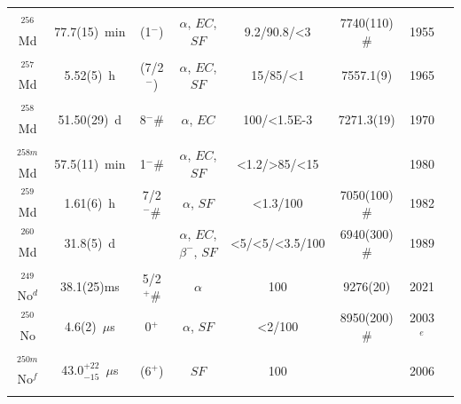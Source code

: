 \begin{center}
\begin{longtable}{c|ccccccl}
			& 				&			&					&			&				    &		&{\tiny\cite{Devaraja2019}}\\
$^{256}$Md	& 77.7(15)~min	&  (1$^-$)	&$\alpha$, $EC$, $SF$&9.2/90.8/<3& 7740(110)$\#$	&1955	&{\tiny\cite{Ghiorso1955,Phillips1958,Sikkeland1965,Fields1970,Hoff1971,Moody1993}}\\
			& 				&			&					&			&				    &		&{\tiny\cite{Ahmad2000,Devaraja2019}}\\
$^{257}$Md	& 5.52(5)~h		&  (7/2$^-$)	&$\alpha$, $EC$, $SF$	&15/85/<1& 7557.1(9)	&1965	&{\tiny\cite{Sikkeland1965,Fields1970,Hoff1971,Moody1993,Holden2000,Pal2021}}\\
			& 				&			&					&			&				    &		&{\tiny\cite{Devaraja2019}}\\
$^{258}$Md	& 51.50(29)~d	&  8$^- \#$	&$\alpha$, $EC$	    &100/<1.5E-3& 7271.3(19)		&1970	&{\tiny\cite{Hulet1968,Fields1970,Hoffman1980,Hulet1986,Moody1993,Ahmad2000}}\\
			& 				&			&					&			&				    &		&{\tiny\cite{Devaraja2019}}\\
$^{258m}$Md	& 57.5(11)~min	&  1$^- \#$	&$\alpha$, $EC$, $SF$&<1.2/>85/<15& 				&1980	&{\tiny\cite{Hulet1968,Fields1970,Hoffman1980,Hulet1986,Moody1993,Ahmad2000}}\\
$^{259}$Md	& 1.61(6)~h		& 7/2$^- \#$&$\alpha$, $SF$		&<1.3/100	& 7050(100)$\#$	    &1982	&{\tiny\cite{Wild1982,Hulet1989,Sokol1991,Moody1993,Holden2000}}\\
$^{260}$Md	& 31.8(5)~d		&  			&$\alpha$, $EC$, $\beta^-$, $SF$&<5/<5/<3.5/100&6940(300)$\#$&1989&{\tiny\cite{Lougheed1986,Hulet1989,Devaraja2019}}\\
\hline\\
$^{249}$No$^d$& 38.1(25)ms	& 5/2$^+ \#$&$\alpha$			&100		& 9276(20)		    &2021	&{\tiny\cite{Svirikhin2021,Khuyagbaatar2021,Lopez-Martens2022}}\\
$^{250}$No	& 4.6(2)~$\mu$s	& 0$^+$	    &$\alpha$, $SF$	    &<2/100		& 8950(200)$\#$	    &2003$^e$&{\tiny\cite{TerAkopian1975,Oganessian2001,Belozerov2003,Peterson2006,Knyazheva2008,Kallunkathariyil2020}}\\
			& 				&          	&					&			&				    &		&{\tiny\cite{Kuznetsova2020,Svirikhin2020,Khuyagbaatar2022}}\\
$^{250m}$No$^f$& 43.0$^{+22}_{-15}$~$\mu$s&(6$^+$)&$SF$		&100		&			        &2006	&{\tiny\cite{Belozerov2003,Popeko2003,Yeremin2003,Peterson2006,Kallunkathariyil2020,Kuznetsova2020}}\\
			&				&			&					&			&				    &		&{\tiny\cite{Svirikhin2020,Isaev2021,Khuyagbaatar2022}}\\

\end{longtable}
\end{center}
